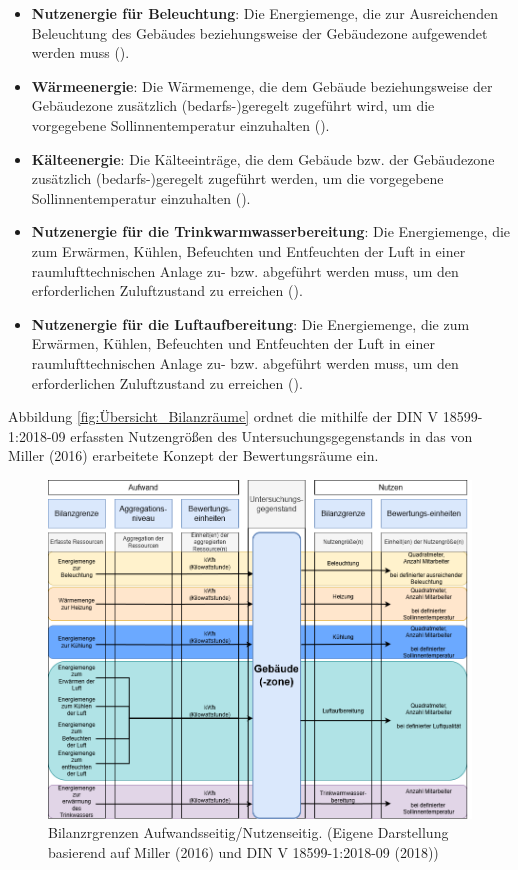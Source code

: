 \begin{itemize}
    \item \textbf{Nutzenergie für Beleuchtung}: Die Energiemenge, die zur Ausreichenden Beleuchtung des Gebäudes beziehungsweise der Gebäudezone 
    aufgewendet werden muss (\cite[Kapitel 5.3.1]{DIN18599.2018}).
    \item \textbf{Wärmeenergie}: Die Wärmemenge, die dem Gebäude beziehungsweise der Gebäudezone zusätzlich (bedarfs-)geregelt zugeführt wird, 
    um die vorgegebene Sollinnentemperatur einzuhalten (\cite[Kapitel 5.3.1]{DIN18599.2018}).
    \item \textbf{Kälteenergie}: Die Kälteeinträge, die dem Gebäude bzw. der Gebäudezone zusätzlich (bedarfs-)geregelt zugeführt werden, um die 
    vorgegebene Sollinnentemperatur einzuhalten (\cite[Kapitel 5.3.1]{DIN18599.2018}).
    \item \textbf{Nutzenergie für die Trinkwarmwasserbereitung}: Die Energiemenge, die zum Erwärmen, Kühlen, Befeuchten und Entfeuchten der 
    Luft in einer raumlufttechnischen Anlage zu- bzw. abgeführt werden muss, um den erforderlichen Zuluftzustand zu erreichen (\cite[Kapitel 5.3.1]{DIN18599.2018}).
    \item \textbf{Nutzenergie für die Luftaufbereitung}: Die Energiemenge, die zum Erwärmen, Kühlen, Befeuchten und Entfeuchten der Luft in 
    einer raumlufttechnischen Anlage zu- bzw. abgeführt werden muss, um den erforderlichen Zuluftzustand zu erreichen (\cite[Kapitel 5.3.1]{DIN18599.2018}).
\end{itemize}

Abbildung \eqref{fig:Übersicht_Bilanzräume} ordnet die mithilfe der DIN V 18599-1:2018-09 erfassten Nutzengrößen des Untersuchungsgegenstands in das von 
Miller (2016) erarbeitete Konzept der Bewertungsräume ein.

\begin{figure}[H]
    \centering
    \includegraphics[width=1\textwidth]{../../Ressourcen/Abbildungen/Nutzengröße_Bewertungseinheit.png}
    \caption{Bilanzrgrenzen Aufwandsseitig/Nutzenseitig. (Eigene Darstellung basierend auf Miller (2016) und DIN V 18599-1:2018-09 (2018))}
    \label{fig:Übersicht_Bilanzräume}
\end{figure}

